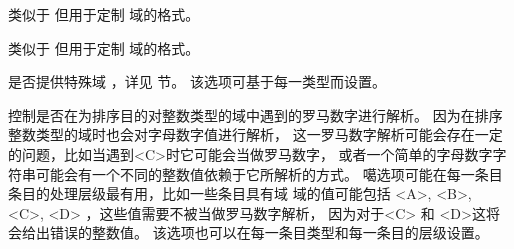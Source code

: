 \begin{optionlist}


类似于  但用于定制  域的格式。


类似于  但用于定制  域的格式。



是否提供特殊域 ，详见   节。
该选项可基于每一类型而设置。




控制是否在为排序目的对整数类型的域中遇到的罗马数字进行解析。
因为\biber 在排序整数类型的域时也会对字母数字值进行解析，
这一罗马数字解析可能会存在一定的问题，比如当遇到<C>时它可能会当做罗马数字，
或者一个简单的字母数字字符串可能会有一个不同的整数值依赖于它所解析的方式。
噶选项可能在每一条目条目的处理层级最有用，比如一些条目具有域
域的值可能包括 <A>, <B>, <C>, <D> ，这些值需要不被当做罗马数字解析，
因为对于<C> 和 <D>这将会给出错误的整数值。
该选项也可以在每一条目类型和每一条目的层级设置。





\end{optionlist}
